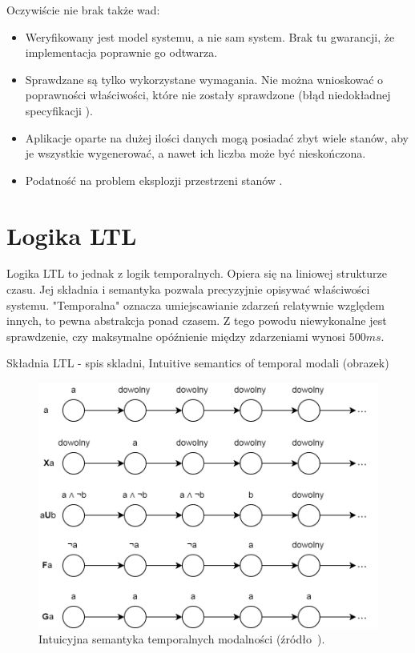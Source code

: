 \vspace{0.5cm}
\noindent
Oczywiście nie brak także wad:
\begin{itemize}
\item Weryfikowany jest model systemu, a nie sam system. Brak tu gwarancji, że implementacja poprawnie go odtwarza.
\item Sprawdzane są tylko wykorzystane wymagania. Nie można wnioskować o poprawności właściwości, które nie zostały sprawdzone (błąd niedokładnej specyfikacji \cite{Lam05}).
\item Aplikacje oparte na dużej ilości danych mogą posiadać zbyt wiele stanów, aby je wszystkie wygenerować, a nawet ich liczba może być nieskończona.
\item Podatność na problem eksplozji przestrzeni stanów \cite{Cla11}.
\end{itemize}


\section{Logika LTL}

Logika LTL to jednak z logik temporalnych. Opiera się na liniowej strukturze czasu.
Jej składnia i semantyka pozwala precyzyjnie opisywać właściwości systemu.
"Temporalna" oznacza umiejscawianie zdarzeń relatywnie względem innych, to pewna abstrakcja ponad czasem.  Z tego powodu niewykonalne jest sprawdzenie, czy maksymalne opóźnienie między zdarzeniami wynosi $500ms$.

Składnia LTL
- spis skladni, Intuitive semantics of temporal modali (obrazek)

\begin{figure}[h]
    \centering
    \includegraphics[width=\textwidth,keepaspectratio]{img/ltl_intuitive_semantics.png}
    \caption{Intuicyjna semantyka temporalnych modalności (źródło~\cite{Bai08}).}
    \label{fig:ltl_semantics}
\end{figure}


